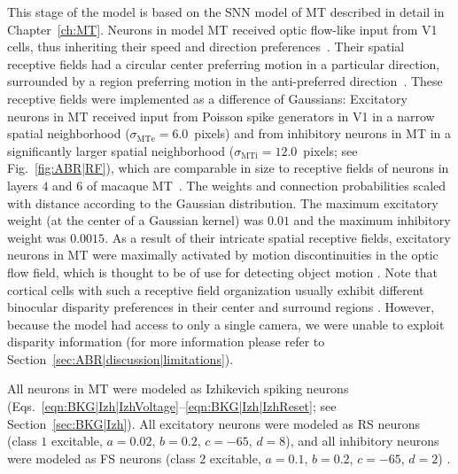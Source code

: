 This stage of the model is based on the \ac{SNN} model of \ac{MT}
described in detail in Chapter~\ref{ch:MT}.
Neurons in model \ac{MT} received optic flow-like input
from \ac{V1} cells, thus inheriting their speed and 
direction preferences~\citep{BornBradley2005}.
Their spatial receptive fields had
a circular center preferring motion in a particular direction, surrounded
by a region preferring motion in the anti-preferred
direction~\citep{Allman1985,Born2000}.
These receptive fields were implemented as a difference of 
Gaussians: Excitatory
neurons in \ac{MT} received input from Poisson spike generators
in \ac{V1} in a narrow spatial neighborhood 
($\sigma_{\textrm{MTe}} = 6.0$~pixels)
and from inhibitory neurons in MT in a significantly larger spatial
neighborhood 
($\sigma_{\textrm{MTi}} = 12.0$~pixels; see Fig.~\ref{fig:ABR|RF}),
which are comparable
in size to receptive fields of neurons in layers $4$ and $6$ of
macaque 
\ac{MT}~\citep{Raiguel1995}. The
weights and connection probabilities scaled with distance according
to the Gaussian distribution. The maximum excitatory weight
(at the center of a Gaussian kernel) was $0.01$ and the maximum
inhibitory weight was $0.0015$. As a result of their intricate
spatial receptive fields, excitatory neurons in MT were maximally
activated by motion discontinuities in the optic flow field,
which is thought to be of use for detecting object 
motion \citep{Allman1985,Bradley1998}.
Note that cortical cells
with such a receptive field organization usually exhibit different
binocular disparity preferences in their center and surround 
regions \citep{Bradley1998}.
However, because the model had
access to only a single camera, we were unable to exploit disparity
information (for more information please refer to 
Section~\ref{sec:ABR|discussion|limitations}).

All neurons in MT were modeled as Izhikevich spiking
neurons~\citep{Izhikevich2003} 
(Eqs.~\ref{eqn:BKG|Izh|IzhVoltage}--\ref{eqn:BKG|Izh|IzhReset};
see Section~\ref{sec:BKG|Izh}).
All excitatory neurons were modeled as \acf{RS} neurons
(class $1$ excitable, $a = 0.02$, $b = 0.2$, $c = −65$,
$d = 8$), and all inhibitory neurons were modeled as \acf{FS} neurons
(class $2$ excitable, $a = 0.1$, $b = 0.2$, $c = −65$, $d = 2$)
\citep{Izhikevich2003}.

